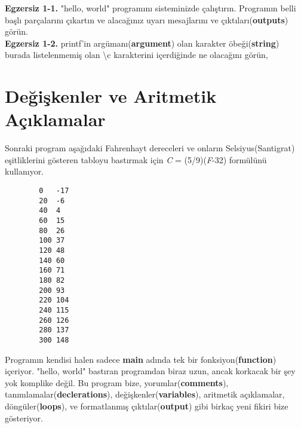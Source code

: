\documentclass[a4paper,12pt,oneside]{book}
\begin{document}
\textbf{Egzersiz 1-1.} "hello, world" programını sisteminizde çalıştırın. Programın belli başlı parçalarını çıkartın ve alacağınız uyarı mesajlarını ve çıktıları(\textbf{outputs}) görün. \\

\textbf{Egzersiz 1-2.} printf'in argümanı(\textbf{argument}) olan karakter öbeği(\textbf{string}) burada listelenmemiş olan \textbackslash c karakterini içerdiğinde ne olacağını görün,

\section{Değişkenler ve Aritmetik Açıklamalar}

Sonraki program aşağıdaki Fahrenhayt dereceleri ve onların Selsiyus(Santigrat) eşitliklerini gösteren tabloyu bastırmak için \degree \textit{C} = (5/9)(\degree \textit{F}-32) formülünü kullanıyor.

\begin{lstlisting}
        0   -17
        20  -6
        40  4
        60  15
        80  26
        100 37
        120 48
        140 60
        160 71
        180 82
        200 93
        220 104
        240 115
        260 126
        280 137
        300 148
\end{lstlisting}
\par Programın kendisi halen sadece \textbf{main} adında tek bir fonksiyon(\textbf{function}) içeriyor. "hello, world" bastıran programdan biraz uzun, ancak korkacak bir şey yok komplike değil. Bu program bize, yorumlar(\textbf{comments}), tanımlamalar(\textbf{declerations}), değişkenler(\textbf{variables}), aritmetik açıklamalar, döngüler(\textbf{loops}), ve formatlanmış çıktılar(\textbf{output}) gibi birkaç yeni fikiri bize gösteriyor.
\end{document}
